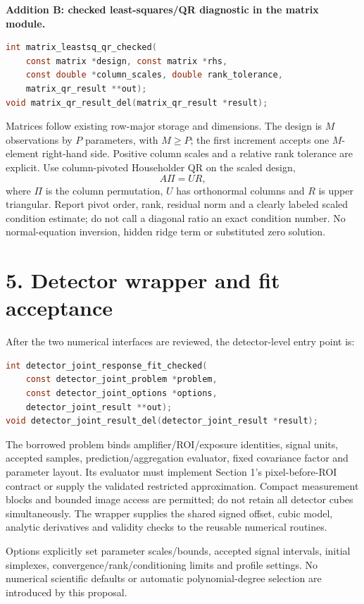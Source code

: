 \documentclass[11pt,a4paper]{article}
\begin{document}
\textbf{Addition B: checked least-squares/QR diagnostic in the matrix module.}
\begin{lstlisting}[language=C]
int matrix_leastsq_qr_checked(
    const matrix *design, const matrix *rhs,
    const double *column_scales, double rank_tolerance,
    matrix_qr_result **out);
void matrix_qr_result_del(matrix_qr_result *result);
\end{lstlisting}
Matrices follow existing row-major storage and dimensions. The design is $M$
observations by $P$ parameters, with $M\ge P$; the first increment accepts one
$M$-element right-hand side. Positive column scales and a relative rank tolerance
are explicit. Use column-pivoted Householder QR on the scaled design,
\[
A\Pi=UR ,
\]
where $\Pi$ is the column permutation, $U$ has orthonormal columns and $R$ is
upper triangular. Report pivot order, rank, residual norm and a clearly labeled
scaled condition estimate; do not call a diagonal ratio an exact condition number.
No normal-equation inversion, hidden ridge term or substituted zero solution.

\clearpage
\section*{5. Detector wrapper and fit acceptance}
After the two numerical interfaces are reviewed, the detector-level entry point is:
\begin{lstlisting}[language=C]
int detector_joint_response_fit_checked(
    const detector_joint_problem *problem,
    const detector_joint_options *options,
    detector_joint_result **out);
void detector_joint_result_del(detector_joint_result *result);
\end{lstlisting}

The borrowed problem binds amplifier/ROI/exposure identities, signal units,
accepted samples, prediction/aggregation evaluator, fixed covariance factor and
parameter layout. Its evaluator must implement Section 1's pixel-before-ROI
contract or supply the validated restricted approximation. Compact measurement
blocks and bounded image access are permitted; do not retain all detector cubes
simultaneously. The wrapper supplies the shared signed offset, cubic model,
analytic derivatives and validity checks to the reusable numerical routines.

Options explicitly set parameter scales/bounds, accepted signal intervals,
initial simplexes, convergence/rank/conditioning limits and profile settings.
No numerical scientific defaults or automatic polynomial-degree selection
are introduced by this proposal.
\end{document}
